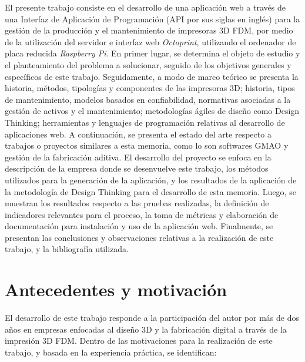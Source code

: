 El presente trabajo consiste en el desarrollo de una aplicación web a través de una Interfaz de Aplicación de Programación (API por sus siglas en inglés) para la gestión de la producción y el mantenimiento de impresoras 3D FDM, por medio de la utilización del servidor e interfaz web \textit{Octoprint}, utilizando el ordenador de placa reducida \textit{Raspberry Pi}.  
En primer lugar, se determina el objeto de estudio y el planteamiento del problema a solucionar, seguido de los objetivos generales y específicos de este trabajo. Seguidamente, a modo de marco teórico se presenta la historia, métodos, tipologías y componentes de las impresoras 3D; historia, tipos de mantenimiento, modelos basados en confiabilidad, normativas asociadas a la gestión de activos y el mantenimiento; metodologías ágiles de diseño como Design Thinking; herramientas y lenguajes de programación relativas al desarrollo de aplicaciones web. A continuación, se presenta el estado del arte respecto a trabajos o proyectos similares a esta memoria, como lo son softwares GMAO y gestión de la fabricación aditiva. El desarrollo del proyecto se enfoca en la descripción de la empresa donde se desenvuelve este trabajo, los métodos utilizados para la generación de la aplicación, y los resultados de la aplicación de la metodología de Design Thinking para el desarrollo de esta memoria. Luego, se muestran los resultados respecto a las pruebas realizadas, la definición de indicadores relevantes para el proceso, la toma de métricas y elaboración de documentación para instalación y uso de la aplicación web. Finalmente, se presentan las conclusiones y observaciones relativas a la realización de este trabajo, y la bibliografía utilizada. 

\newpage

\section{Antecedentes y motivaci\'on}
\label{intro:motivacion}

 El desarrollo de este trabajo responde a la participación del autor por más de dos años en empresas enfocadas al diseño 3D y la fabricación digital a través de la impresión 3D FDM. Dentro de las motivaciones para la realización de este trabajo, y basada en la experiencia práctica, se identifican:

